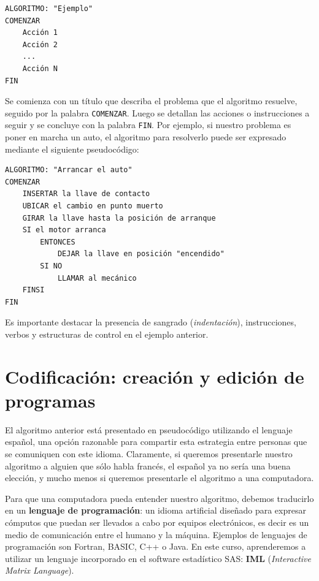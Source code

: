 \documentclass[]{book}
\begin{document}
\begin{verbatim}
ALGORITMO: "Ejemplo"
COMENZAR
    Acción 1
    Acción 2
    ...
    Acción N
FIN
\end{verbatim}

Se comienza con un título que describa el problema que el algoritmo
resuelve, seguido por la palabra \texttt{COMENZAR}. Luego se detallan
las acciones o instrucciones a seguir y se concluye con la palabra
\texttt{FIN}. Por ejemplo, si nuestro problema es poner en marcha un
auto, el algoritmo para resolverlo puede ser expresado mediante el
siguiente pseudocódigo:

\begin{verbatim}
ALGORITMO: "Arrancar el auto"
COMENZAR
    INSERTAR la llave de contacto
    UBICAR el cambio en punto muerto
    GIRAR la llave hasta la posición de arranque
    SI el motor arranca 
        ENTONCES
            DEJAR la llave en posición "encendido"
        SI NO
            LLAMAR al mecánico
    FINSI
FIN
\end{verbatim}

Es importante destacar la presencia de sangrado (\emph{indentación}),
instrucciones, verbos y estructuras de control en el ejemplo anterior.

\section{Codificación: creación y edición de
programas}\label{codificacion-creacion-y-edicion-de-programas}

El algoritmo anterior está presentado en pseudocódigo utilizando el
lenguaje español, una opción razonable para compartir esta estrategia
entre personas que se comuniquen con este idioma. Claramente, si
queremos presentarle nuestro algoritmo a alguien que sólo habla francés,
el español ya no sería una buena elección, y mucho menos si queremos
presentarle el algoritmo a una computadora.

Para que una computadora pueda entender nuestro algoritmo, debemos
traducirlo en un \textbf{lenguaje de programación}: un idioma artificial
diseñado para expresar cómputos que puedan ser llevados a cabo por
equipos electrónicos, es decir es un medio de comunicación entre el
humano y la máquina. Ejemplos de lenguajes de programación son Fortran,
BASIC, C++ o Java. En este curso, aprenderemos a utilizar un lenguaje
incorporado en el software estadístico SAS: \textbf{IML}
(\emph{Interactive Matrix Language}).
\end{document}
